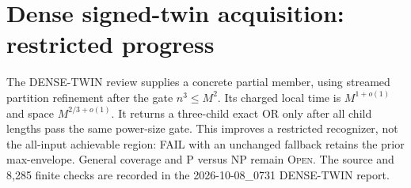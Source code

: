 \section{Dense signed-twin acquisition: restricted progress}
The DENSE-TWIN review supplies a concrete partial member, using streamed
partition refinement after the gate $n^3\le M^2$. Its charged local time is
$M^{1+o(1)}$ and space $M^{2/3+o(1)}$. It returns a three-child exact OR
only after all child lengths pass the same power-size gate. This improves
a restricted recognizer, not the all-input achievable region: FAIL with an
unchanged fallback retains the prior max-envelope. General coverage and
P versus NP remain \textsc{Open}. The source and 8,285 finite checks are
recorded in the 2026-10-08\_0731 DENSE-TWIN report.
